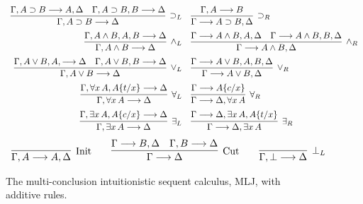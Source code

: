 \documentclass{llncs}
\begin{document}



\newpage
\appendix

\begin{figure}
\[
\begin{array} {r@{\quad}l}
\infer[{\supset_L}]{\Gamma, A\supset B \longrightarrow \Delta}{\Gamma,
A\supset B \longrightarrow A, \Delta \quad \Gamma,A\supset B, B \longrightarrow
\Delta }
&
\infer[{\supset_R}]{\Gamma \longrightarrow A \supset B, \Delta}{\Gamma, A
\longrightarrow B}
\\[5pt]
\infer[{\land_L}]{\Gamma, A \land B \longrightarrow \Delta}{\Gamma, A \land
B, A,B \longrightarrow \Delta }
&
\infer[{\land_R}]{\Gamma \longrightarrow A \land B, \Delta}{\Gamma \longrightarrow
A \land B, A, \Delta \quad \Gamma \longrightarrow A \land B,B, \Delta}
\\
[5pt]
\infer[{\lor_L}]{\Gamma, A \lor B \longrightarrow  \Delta}{\Gamma, A \lor B,
A, \longrightarrow \Delta \quad \Gamma, A \lor B,B \longrightarrow  \Delta}
&
\infer[{\lor_R}]{\Gamma \longrightarrow A \lor B, \Delta}{\Gamma \longrightarrow A
\lor B, A,B, \Delta }
\\
[5pt]
\infer[{\forall_L}]{\Gamma, \forall x\,A \longrightarrow \Delta}{\Gamma,
\forall x\,A, A\{t/x\} \longrightarrow \Delta} 
&
\infer[{\forall_R}]{\Gamma \longrightarrow \Delta, \forall x\,A}{\Gamma
\longrightarrow A\{c/x\}}
\\
[5pt]
\infer[{\exists_L}]{\Gamma, \exists x\, A \longrightarrow
\Delta}{\Gamma, \exists x\, A , A\{c/ x\} \longrightarrow \Delta} 
&
\infer[{\exists_R}]{\Gamma \longrightarrow \Delta, \exists x\, A}
{\Gamma \longrightarrow \Delta, \exists x\, A, A \{t/x\}}
\end{array}
\]
\[
\begin{array}{c@{\qquad}c@{\qquad}c}
 \infer[{\textrm{Init}}]{\Gamma,A \longrightarrow A, \Delta}{} 
&
\infer[{\textrm{Cut}}]{\Gamma \longrightarrow \Delta}{\Gamma
\longrightarrow B,\Delta \quad \Gamma, B \longrightarrow \Delta}
&
\infer[{\bot_L}]{\Gamma,\bot \longrightarrow \Delta}{} 
\end{array}
\]
\caption{The multi-conclusion intuitionistic sequent calculus, MLJ,
with additive rules.}\label{Fig:mLJ}
\end{figure}
\end{document}
